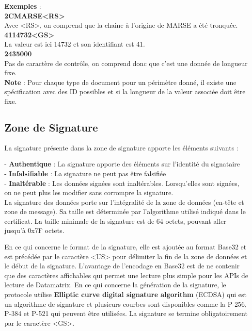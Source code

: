 \textbf{Exemples} :\\
\textbf{2CMARSE<RS>}\\
Avec <RS>, on comprend que la chaine à l’origine de MARSE a été tronquée.\\

\textbf{4114732<GS>}\\
La valeur est ici 14732 et son identifiant est 41.\\

\textbf{2435000}\\
Pas de caractère de contrôle, on comprend donc que c’est une donnée de longueur fixe.\\

\textbf{Note} : Pour chaque type de document pour un périmètre donné, il existe une spécification avec des ID possibles et si la longueur de la valeur associée doit être fixe.

\subsection{Zone de Signature}
La signature présente dans la zone de signature apporte les éléments suivants :

- \textbf{Authentique} : La signature apporte des éléments sur l’identité du signataire \\
- \textbf{Infalsifiable} : La signature ne peut pas être falsifiée \\
- \textbf{Inaltérable} : Les données signées sont inaltérables. Lorsqu’elles sont signées, on ne peut plus les modifier sans corrompre la signature. \\

La signature des données porte sur l’intégralité de la zone de données (en-tête et zone de message). Sa taille est déterminée par l’algorithme utilisé indiqué dans le certificat. La taille minimale de la signature est de 64 octets, pouvant aller jusqu’à 0x7F octets.

En ce qui concerne le format de la signature, elle est ajoutée au format Base32 et est précédée par le caractère <US> pour délimiter la fin de la zone de données et le début de la signature. L’avantage de l’encodage en Base32 est de ne contenir que des caractères affichables qui permet une lecture plus simple pour les APIs de lecture de Datamatrix. En ce qui concerne la génération de la signature, le protocole utilise \textbf{Elliptic curve digital signature algorithm} (ECDSA) qui est un algorithme de signature et plusieurs courbes sont disponibles comme la P-256, P-384 et P-521 qui peuvent être utilisées. La signature se termine obligatoirement par le caractère <GS>.

